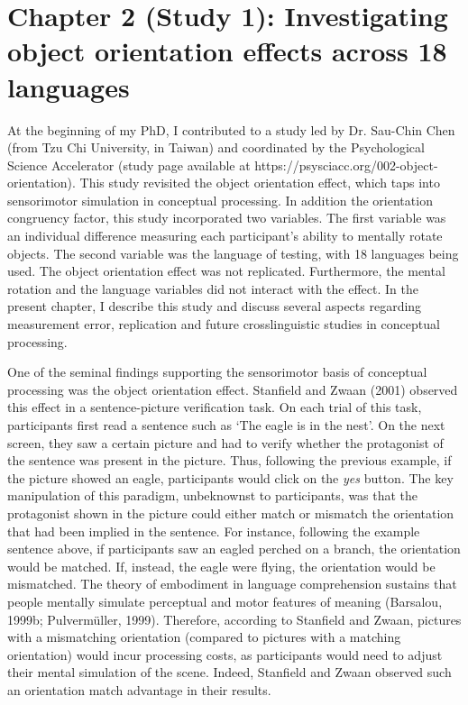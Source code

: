 \documentclass[
  12pt,
  man,floatsintext]{apa7}
\begin{document}
\clearpage

\hypertarget{chapter-2-study-1-investigating-object-orientation-effects-across-18-languages}{%
\section{Chapter 2 (Study 1): Investigating object orientation effects across 18 languages}\label{chapter-2-study-1-investigating-object-orientation-effects-across-18-languages}}

\bigskip
\bigskip
\bigskip

\begin{adjustwidth}{1.5cm}{1.5cm}

At the beginning of my PhD, I contributed to a study led by Dr. Sau-Chin Chen (from Tzu Chi University, in Taiwan) and coordinated by the Psychological Science Accelerator (study page available at https://psysciacc.org/002-object-orientation). This study revisited the object orientation effect, which taps into sensorimotor simulation in conceptual processing. In addition the orientation congruency factor, this study incorporated two variables. The first variable was an individual difference measuring each participant's ability to mentally rotate objects. The second variable was the language of testing, with 18 languages being used. The object orientation effect was not replicated. Furthermore, the mental rotation and the language variables did not interact with the effect. In the present chapter, I describe this study and discuss several aspects regarding measurement error, replication and future crosslinguistic studies in conceptual processing.

\end{adjustwidth}

\bigskip
\bigskip
\bigskip

One of the seminal findings supporting the sensorimotor basis of conceptual processing was the object orientation effect. Stanfield and Zwaan (2001) observed this effect in a sentence-picture verification task. On each trial of this task, participants first read a sentence such as `The eagle is in the nest'. On the next screen, they saw a certain picture and had to verify whether the protagonist of the sentence was present in the picture. Thus, following the previous example, if the picture showed an eagle, participants would click on the \emph{yes} button. The key manipulation of this paradigm, unbeknownst to participants, was that the protagonist shown in the picture could either match or mismatch the orientation that had been implied in the sentence. For instance, following the example sentence above, if participants saw an eagled perched on a branch, the orientation would be matched. If, instead, the eagle were flying, the orientation would be mismatched. The theory of embodiment in language comprehension sustains that people mentally simulate perceptual and motor features of meaning (Barsalou, 1999b; Pulvermüller, 1999). Therefore, according to Stanfield and Zwaan, pictures with a mismatching orientation (compared to pictures with a matching orientation) would incur processing costs, as participants would need to adjust their mental simulation of the scene. Indeed, Stanfield and Zwaan observed such an orientation match advantage in their results.
\end{document}
